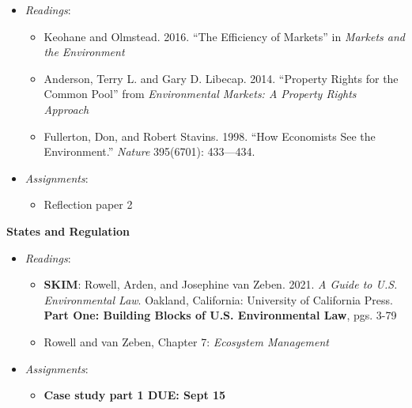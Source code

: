 \begin{itemize}

\item
  \emph{Readings}:

  \begin{itemize}
  
  \item
    Keohane and Olmstead. 2016. ``The Efficiency of Markets'' in
    \emph{Markets and the Environment}
  \item
    Anderson, Terry L. and Gary D. Libecap. 2014. ``Property Rights for
    the Common Pool'' from \emph{Environmental Markets: A Property
    Rights Approach}
  \item
    Fullerton, Don, and Robert Stavins. 1998. ``How Economists See the
    Environment.'' \emph{Nature} 395(6701): 433---434.
  \end{itemize}
\item
  \emph{Assignments}:

  \begin{itemize}
  
  \item
    Reflection paper 2
  \end{itemize}
\end{itemize}

\week \textbf{States and Regulation}

\begin{itemize}

\item
  \emph{Readings}:

  \begin{itemize}
  
  \item
    \textbf{SKIM}: Rowell, Arden, and Josephine van Zeben. 2021. \emph{A
    Guide to U.S. Environmental Law}. Oakland, California: University of
    California Press. \textbf{Part One: Building Blocks of U.S.
    Environmental Law}, pgs. 3-79
  \item
    Rowell and van Zeben, Chapter 7: \emph{Ecosystem Management}
  \end{itemize}
\item
  \emph{Assignments}:

  \begin{itemize}
  
  \item
    \textbf{Case study part 1 DUE: Sept 15}
  \end{itemize}
\end{itemize}

